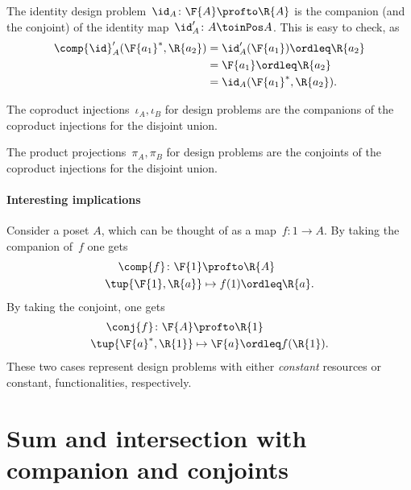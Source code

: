 \begin{example}The identity design problem~$\id_A\colon \F{A} \profto \R{A}$ is the companion (and the conjoint) of the identity map~$\id_A'\colon A \toinPos A$. This is easy to check, as
\begin{equation}
    \begin{aligned}
    \comp{\id}_A'(\F{a_1}^*,\R{a_2})&=\id_A'(\F{a_1})\ordleq \R{a_2}\\
    &=\F{a_1}\ordleq \R{a_2}\\
    &=\id_A(\F{a_1}^*,\R{a_2}).
    \end{aligned}
\end{equation}
\end{example}

\begin{example}The coproduct injections~$\iota_A, \iota_B$ for design problems are the companions of the coproduct injections for the disjoint union.
\end{example}

\begin{example}The product projections~$\pi_A, \pi_B$ for design problems are the conjoints of the coproduct injections for the disjoint union.
\end{example}


\paragraph{Interesting implications}
Consider a poset $A$, which can be thought of as a map~$f\colon 1\to A$. By taking the companion of~$f$ one gets
\begin{equation}
\begin{aligned}
    \comp{f}\colon \F{1}&\profto \R{A}\\
    \tup{\F{1},\R{a}}&\mapsto f(1)\ordleq \R{a}.
\end{aligned}
\end{equation}
By taking the conjoint, one gets
\begin{equation}
\begin{aligned}
    \conj{f}\colon \F{A}&\profto \R{1}\\
    \tup{\F{a}^*,\R{1}}&\mapsto \F{a}\ordleq f(\R{1}).
\end{aligned}
\end{equation}
These two cases represent design problems with either \emph{constant} resources or constant, functionalities, respectively.


\section{Sum and intersection with companion and conjoints}

